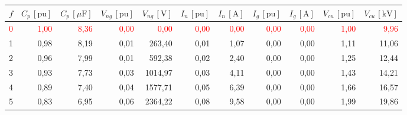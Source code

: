 \begin{tabular}{rrrrrrrrrrr}
\toprule
$f$ & $C_p \, [\mathrm{pu}]$ & $C_p \, [\mu\mathrm{F}]$ & $V_{ng} \, [\mathrm{pu}]$ & $V_{ng} \, [\mathrm{V}]$ & $I_{n} \, [\mathrm{pu}]$ & $I_{n} \, [\mathrm{A}]$ & $I_{g} \, [\mathrm{pu}]$ & $I_{g} \, [\mathrm{A}]$ & $V_{cu} \, [\mathrm{pu}]$ & $V_{cu} \, [\mathrm{kV}]$ \\
\midrule
\textcolor{red}{0} & \textcolor{red}{1,00} & \textcolor{red}{8,36} & \textcolor{red}{0,00} & \textcolor{red}{0,00} & \textcolor{red}{0,00} & \textcolor{red}{0,00} & \textcolor{red}{0,00} & \textcolor{red}{0,00} & \textcolor{red}{1,00} & \textcolor{red}{9,96} \\
1 & 0,98 & 8,19 & 0,01 & 263,40 & 0,01 & 1,07 & 0,00 & 0,00 & 1,11 & 11,06 \\
2 & 0,96 & 7,99 & 0,01 & 592,38 & 0,02 & 2,40 & 0,00 & 0,00 & 1,25 & 12,44 \\
3 & 0,93 & 7,73 & 0,03 & 1014,97 & 0,03 & 4,11 & 0,00 & 0,00 & 1,43 & 14,21 \\
4 & 0,89 & 7,40 & 0,04 & 1577,71 & 0,05 & 6,39 & 0,00 & 0,00 & 1,66 & 16,57 \\
5 & 0,83 & 6,95 & 0,06 & 2364,22 & 0,08 & 9,58 & 0,00 & 0,00 & 1,99 & 19,86 \\
\bottomrule
\end{tabular}